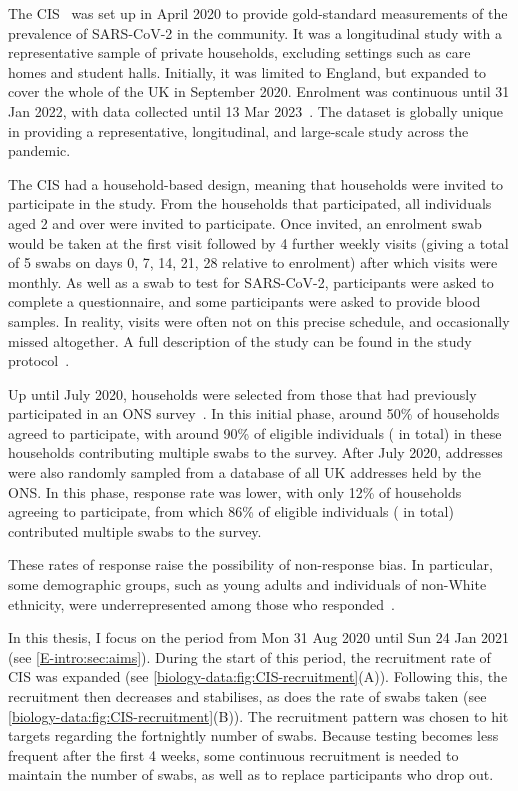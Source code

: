 \documentclass[thesis.tex]{subfiles}
\begin{document}
The CIS~\autocite{CIS} was set up in April 2020 to provide gold-standard measurements of the prevalence of SARS-CoV-2 in the community.
It was a longitudinal study with a representative sample of private households, \ie excluding settings such as care homes and student halls.
Initially, it was limited to England, but expanded to cover the whole of the UK in September 2020.
Enrolment was continuous until 31 Jan 2022, with data collected until 13 Mar 2023~\autocite{weiRisk}. 
The dataset is globally unique in providing a representative, longitudinal, and large-scale study across the pandemic.

The CIS had a household-based design, meaning that households were invited to participate in the study.
From the households that participated, all individuals aged 2 and over were invited to participate.
Once invited, an enrolment swab would be taken at the first visit followed by 4 further weekly visits (giving a total of 5 swabs on days 0, 7, 14, 21, 28 relative to enrolment) after which visits were monthly.
As well as a swab to test for SARS-CoV-2, participants were asked to complete a questionnaire, and some participants were asked to provide blood samples.
In reality, visits were often not on this precise schedule, and occasionally missed altogether.
A full description of the study can be found in the study protocol~\autocite{cisProtocol}.

Up until July 2020, households were selected from those that had previously participated in an ONS survey~\autocite{CIStechData}.
In this initial phase, around 50\% of households agreed to participate, with around 90\% of eligible individuals ( in total) in these households contributing multiple swabs to the survey.
After July 2020, addresses were also randomly sampled from a database of all UK addresses held by the ONS.
In this phase, response rate was lower, with only 12\% of households agreeing to participate, from which 86\% of eligible individuals ( in total) contributed multiple swabs to the survey.

These rates of response raise the possibility of non-response bias.
In particular, some demographic groups, such as young adults and individuals of non-White ethnicity, were underrepresented among those who responded~\autocite{pouwelsCommunity}.

In this thesis, I focus on the period from Mon 31 Aug 2020 until Sun 24 Jan 2021 (see \cref{E-intro:sec:aims}).
During the start of this period, the recruitment rate of CIS was expanded (see \cref{biology-data:fig:CIS-recruitment}(A)).
Following this, the recruitment then decreases and stabilises, as does the rate of swabs taken (see \cref{biology-data:fig:CIS-recruitment}(B)).
The recruitment pattern was chosen to hit targets regarding the fortnightly number of swabs.
Because testing becomes less frequent after the first 4 weeks, some continuous recruitment is needed to maintain the number of swabs, as well as to replace participants who drop out.
\end{document}

